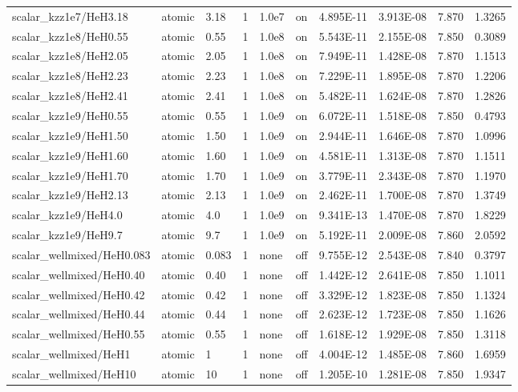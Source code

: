 \documentclass[11pt]{my_memo}
\begin{document}
\begin{longtable}{@{}l >{\raggedright\arraybackslash}p{1.5cm} l l l l l l r r@{}}
scalar\_kzz1e7/HeH3.18 & atomic & 3.18 & 1 & 1.0e7 & on & 4.895E-11 & 3.913E-08 & 7.870 & 1.3265\\
scalar\_kzz1e8/HeH0.55 & atomic & 0.55 & 1 & 1.0e8 & on & 5.543E-11 & 2.155E-08 & 7.850 & 0.3089\\
scalar\_kzz1e8/HeH2.05 & atomic & 2.05 & 1 & 1.0e8 & on & 7.949E-11 & 1.428E-08 & 7.870 & 1.1513\\
scalar\_kzz1e8/HeH2.23 & atomic & 2.23 & 1 & 1.0e8 & on & 7.229E-11 & 1.895E-08 & 7.870 & 1.2206\\
scalar\_kzz1e8/HeH2.41 & atomic & 2.41 & 1 & 1.0e8 & on & 5.482E-11 & 1.624E-08 & 7.870 & 1.2826\\
scalar\_kzz1e9/HeH0.55 & atomic & 0.55 & 1 & 1.0e9 & on & 6.072E-11 & 1.518E-08 & 7.850 & 0.4793\\
scalar\_kzz1e9/HeH1.50 & atomic & 1.50 & 1 & 1.0e9 & on & 2.944E-11 & 1.646E-08 & 7.870 & 1.0996\\
scalar\_kzz1e9/HeH1.60 & atomic & 1.60 & 1 & 1.0e9 & on & 4.581E-11 & 1.313E-08 & 7.870 & 1.1511\\
scalar\_kzz1e9/HeH1.70 & atomic & 1.70 & 1 & 1.0e9 & on & 3.779E-11 & 2.343E-08 & 7.870 & 1.1970\\
scalar\_kzz1e9/HeH2.13 & atomic & 2.13 & 1 & 1.0e9 & on & 2.462E-11 & 1.700E-08 & 7.870 & 1.3749\\
scalar\_kzz1e9/HeH4.0 & atomic & 4.0 & 1 & 1.0e9 & on & 9.341E-13 & 1.470E-08 & 7.870 & 1.8229\\
scalar\_kzz1e9/HeH9.7 & atomic & 9.7 & 1 & 1.0e9 & on & 5.192E-11 & 2.009E-08 & 7.860 & 2.0592\\
scalar\_wellmixed/HeH0.083 & atomic & 0.083 & 1 & none & off & 9.755E-12 & 2.543E-08 & 7.840 & 0.3797\\
scalar\_wellmixed/HeH0.40 & atomic & 0.40 & 1 & none & off & 1.442E-12 & 2.641E-08 & 7.850 & 1.1011\\
scalar\_wellmixed/HeH0.42 & atomic & 0.42 & 1 & none & off & 3.329E-12 & 1.823E-08 & 7.850 & 1.1324\\
scalar\_wellmixed/HeH0.44 & atomic & 0.44 & 1 & none & off & 2.623E-12 & 1.723E-08 & 7.850 & 1.1626\\
scalar\_wellmixed/HeH0.55 & atomic & 0.55 & 1 & none & off & 1.618E-12 & 1.929E-08 & 7.850 & 1.3118\\
scalar\_wellmixed/HeH1 & atomic & 1 & 1 & none & off & 4.004E-12 & 1.485E-08 & 7.860 & 1.6959\\
scalar\_wellmixed/HeH10 & atomic & 10 & 1 & none & off & 1.205E-10 & 1.281E-08 & 7.850 & 1.9347\\

\end{longtable}
\end{document}
